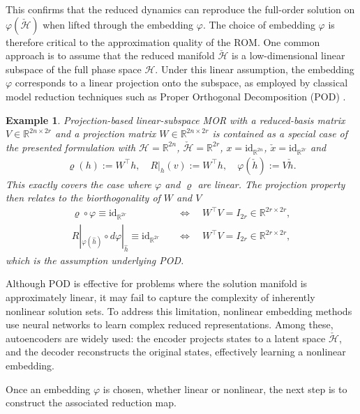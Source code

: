 \documentclass{article}
\theoremstyle{plain}
\theoremstyle{definition}
\newtheorem{example}[theorem]{Example}
\theoremstyle{remark}
\begin{document}
This confirms that the reduced dynamics can reproduce the full-order solution on \(\varphi(\check{\mathcal{H}})\) when lifted through the embedding \(\varphi\).
The choice of embedding \(\varphi\) is therefore critical to the approximation quality of the ROM. One common approach is to assume that the reduced manifold \(\check{\mathcal{H}}\) is a low-dimensional linear subspace of the full phase space \(\mathcal{H}\). Under this linear assumption, the embedding \(\varphi\) corresponds to a linear projection onto the subspace, as employed by classical model reduction techniques such as Proper Orthogonal Decomposition (POD) \cite{berkooz_pod}.
\begin{example}
\label{ex: pod}
\textit{Projection-based linear-subspace MOR with a reduced-basis matrix $V \in \mathbb{R}^{2n \times 2r}$ and a projection matrix $W \in \mathbb{R}^{2n \times 2r}$ is contained as a special case of the presented formulation with $\mathcal{H} = \mathbb{R}^{2n}$, $\check{\mathcal{H}} =  \mathbb{R}^{2r}$, $x = \mathrm{id}_{\mathbb{R}^{2n}}$, $\check{x} = \mathrm{id}_{\mathbb{R}^{2r}}$ and}
\begin{align*}
\varrho(h) := W^{\top} h, \quad R|_h(v) := W^{\top} h, \quad \varphi(\check{h}) := V \check{h}.
\end{align*}
\textit{This exactly covers the case where $\varphi$ and $\varrho$ are linear. The projection property then relates to the biorthogonality of $W$ and $V$}
\begin{align*}
  \varrho \circ \varphi \equiv \mathrm{id}_{\mathbb{R}^{2r}} \quad &\Longleftrightarrow \quad W^{\top} V = I_{2r} \in \mathbb{R}^{2r \times 2r},  \\
R|_{\varphi(\hat{h})} \circ d\varphi|_{\hat{h}} \equiv \mathrm{id}_{\mathbb{R}^{2r}} \quad &\Longleftrightarrow \quad W^{\top} V = I_{2r} \in \mathbb{R}^{2r \times 2r},
\end{align*}
\textit{which is the assumption underlying POD.}
\end{example}
Although POD is effective for problems where the solution manifold is approximately linear, it may fail to capture the complexity of inherently nonlinear solution sets.
To address this limitation, nonlinear embedding methods use neural networks to learn complex reduced representations. Among these, autoencoders are widely used: the encoder projects states to a latent space \(\check{\mathcal{H}}\), and the decoder reconstructs the original states, effectively learning a nonlinear embedding.

Once an embedding \(\varphi\) is chosen, whether linear or nonlinear, the next step is to construct the associated reduction map.
\end{document}
